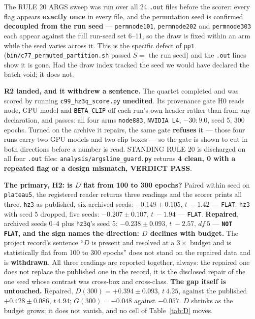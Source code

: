 \documentclass[10pt,letterpaper]{article}
\newcommand{\Dstat}{D}                         %
\newcommand{\Gstat}{G}                         %
\newcommand{\plateau}{\texttt{plateau5}}
\newcommand{\arm}[1]{\texttt{#1}}
\begin{document}
The RULE 20 ARGS sweep was run over all 24 \texttt{.out} files before the scorer: every flag
appears \textbf{exactly once} in every file, and the permutation seed is confirmed
\textbf{decoupled from the run seed} --- \arm{permnode101}, \arm{permnode202} and \arm{permnode303}
each appear against the full run-seed set 6--11, so the draw is fixed within an arm while the seed
varies across it. This is the specific defect of \arm{pp1} (\texttt{bin/c77\_permuted\_partition.sh}
passed $S =$ the run seed) and the \texttt{.out} lines show it is gone. Had the draw index tracked
the seed we would have declared the batch void; it does not.

\textbf{R2 landed, and it withdrew a sentence.} The quartet completed and was scored by running
\texttt{c99\_hz3q\_score.py} \textbf{unedited}. Its provenance gate H0 reads node, GPU model and
\texttt{BETA\_CLIP} off each run's own header rather than from any declaration, and passes: all
four arms \texttt{node883}, \texttt{NVIDIA L4}, $-30{:}9.0$, seed 5, 300 epochs. Turned on the
archive it repairs, the same gate \textbf{refuses} it --- those four runs carry two GPU models and
two clip boxes --- so the gate is shown to cut in both directions before a number is read. STANDING
RULE 20 is discharged on all four \texttt{.out} files: \texttt{analysis/argsline\_guard.py} returns
\textbf{4 clean, 0 with a repeated flag or a design mismatch, VERDICT PASS}.

\textbf{The primary, H2: is $\Dstat$ flat from 100 to 300 epochs?} Paired within seed on \plateau{},
the registered reader returns three readings and the scorer prints all three. \arm{hz3} as
published, six archived seeds: $\mathbf{-0.149 \pm 0.105}$, $t\ -1.42$ --- \texttt{FLAT}. \arm{hz3}
with seed 5 dropped, five seeds: $\mathbf{-0.207 \pm 0.107}$, $t\ -1.94$ --- \texttt{FLAT}.
\textbf{Repaired}, archived seeds 0--4 plus \arm{hz3q}'s seed 5: $\mathbf{-0.238 \pm 0.093}$,
$t\ -2.57$, $df\ 5$ --- \textbf{\texttt{NOT FLAT}, and the sign names the direction: $\Dstat$
declines with budget.} The project record's sentence ``$\Dstat$ is present and resolved at a
$3\times$ budget and is statistically flat from 100 to 300 epochs'' does not stand on the repaired
data and is \textbf{withdrawn}. All three readings are reported together, always: the repaired one
does not replace the published one in the record, it is the disclosed repair of the one seed whose
contrast was cross-box and cross-class. \textbf{The gap itself is untouched.} Repaired,
$\Dstat(300) = +0.394 \pm 0.093$, $t\ 4.25$, against the published $+0.428 \pm 0.086$, $t\ 4.94$;
$\Gstat(300) = -0.048$ against $-0.057$. $\Dstat$ shrinks as the budget grows; it does not vanish,
and no cell of Table~\ref{tab:D} moves.
\end{document}
